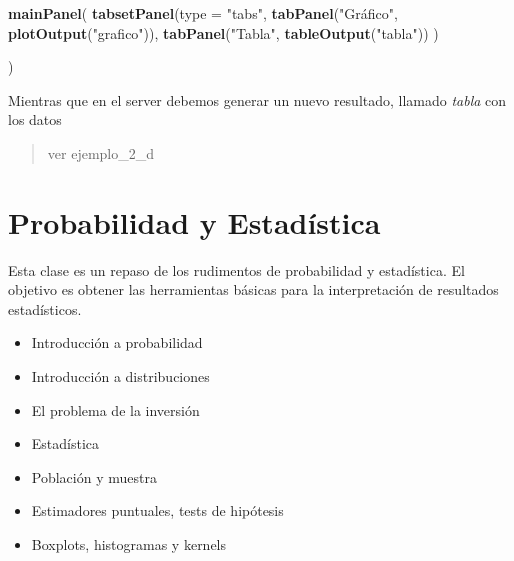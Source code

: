 \documentclass[]{book}
\newenvironment{Shaded}{\begin{snugshade}}{\end{snugshade}}
\newcommand{\DataTypeTok}[1]{\textcolor[rgb]{0.13,0.29,0.53}{#1}}
\newcommand{\KeywordTok}[1]{\textcolor[rgb]{0.13,0.29,0.53}{\textbf{#1}}}
\newcommand{\NormalTok}[1]{#1}
\newcommand{\OperatorTok}[1]{\textcolor[rgb]{0.81,0.36,0.00}{\textbf{#1}}}
\newcommand{\StringTok}[1]{\textcolor[rgb]{0.31,0.60,0.02}{#1}}
\providecommand{\tightlist}{%
  \setlength{\itemsep}{0pt}\setlength{\parskip}{0pt}}
\begin{document}
\begin{Shaded}
\begin{Highlighting}[]
 \KeywordTok{mainPanel}\NormalTok{(}
      \KeywordTok{tabsetPanel}\NormalTok{(}\DataTypeTok{type =} \StringTok{"tabs"}\NormalTok{,}
                  \KeywordTok{tabPanel}\NormalTok{(}\StringTok{"Gráfico"}\NormalTok{, }\KeywordTok{plotOutput}\NormalTok{(}\StringTok{"grafico"}\NormalTok{)),}
                  \KeywordTok{tabPanel}\NormalTok{(}\StringTok{"Tabla"}\NormalTok{, }\KeywordTok{tableOutput}\NormalTok{(}\StringTok{"tabla"}\NormalTok{))}
\NormalTok{      )}

\NormalTok{    )}
\end{Highlighting}
\end{Shaded}

Mientras que en el server debemos generar un nuevo resultado, llamado \emph{tabla} con los datos

\begin{Shaded}
\end{Shaded}

\begin{quote}
ver ejemplo\_2\_d
\end{quote}

\hypertarget{probabilidad-y-estadistica}{%
\chapter{Probabilidad y Estadística}\label{probabilidad-y-estadistica}}

Esta clase es un repaso de los rudimentos de probabilidad y estadística. El objetivo es obtener las herramientas básicas para la interpretación de resultados estadísticos.

\begin{itemize}
\tightlist
\item
  Introducción a probabilidad
\item
  Introducción a distribuciones
\item
  El problema de la inversión
\item
  Estadística
\item
  Población y muestra
\item
  Estimadores puntuales, tests de hipótesis
\item
  Boxplots, histogramas y kernels
\end{itemize}
\end{document}
